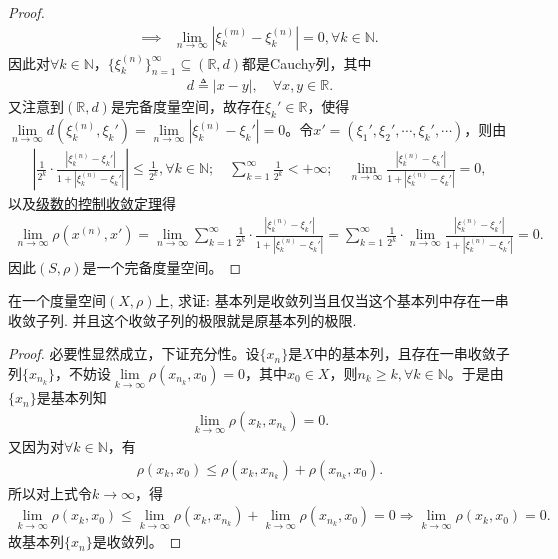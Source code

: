\documentclass[../../main.tex]{subfiles}%
\begin{document}
\begin{proof}
\begin{align*}
\implies&\lim\limits_{n\rightarrow\infty}|\xi_k^{(m)}-\xi_k^{(n)}|=0,\forall k\in\mathbb{N}.
\end{align*}
因此对$\forall k\in\mathbb{N}$，$\{\xi_k^{(n)}\}_{n=1}^{\infty}\subseteq(\mathbb{R},d)$都是Cauchy列，其中
\begin{align*}
d\triangleq|x-y|,\quad\forall x,y\in\mathbb{R}.
\end{align*}
又注意到$(\mathbb{R},d)$是完备度量空间，故存在$\xi_k'\in\mathbb{R}$，使得$\lim\limits_{n\rightarrow\infty}d(\xi_k^{(n)},\xi_k')=\lim\limits_{n\rightarrow\infty}|\xi_k^{(n)}-\xi_k'|=0$。令$x'=(\xi_1',\xi_2',\cdots,\xi_k',\cdots)$，则由
\begin{align*}
\left|\frac{1}{2^k}\cdot\frac{|\xi_k^{(n)}-\xi_k'|}{1+|\xi_k^{(n)}-\xi_k'|}\right|\leqslant\frac{1}{2^k},\forall k\in\mathbb{N};\quad\sum\limits_{k=1}^{\infty}\frac{1}{2^k}<+\infty;\quad\lim\limits_{n\rightarrow\infty}\frac{|\xi_k^{(n)}-\xi_k'|}{1+|\xi_k^{(n)}-\xi_k'|}=0,
\end{align*}
以及\hyperref[Basis of Analytics-theorem:级数的控制收敛定理]{级数的控制收敛定理}得
\begin{align*}
\lim\limits_{n\rightarrow\infty}\rho(x^{(n)},x')=\lim\limits_{n\rightarrow\infty}\sum\limits_{k=1}^{\infty}\frac{1}{2^k}\cdot\frac{|\xi_k^{(n)}-\xi_k'|}{1+|\xi_k^{(n)}-\xi_k'|}=\sum\limits_{k=1}^{\infty}\frac{1}{2^k}\cdot\lim\limits_{n\rightarrow\infty}\frac{|\xi_k^{(n)}-\xi_k'|}{1+|\xi_k^{(n)}-\xi_k'|}=0.
\end{align*}
因此$(S,\rho)$是一个完备度量空间。
\end{proof}

\begin{proposition}\label{proposition:度量空间中基本列收敛当且仅当其子列收敛}
在一个度量空间$(X,\rho)$上, 求证: 基本列是收敛列当且仅当这个基本列中存在一串收敛子列.
并且这个收敛子列的极限就是原基本列的极限.
\end{proposition}
\begin{proof}
必要性显然成立，下证充分性。设$\{x_n\}$是$X$中的基本列，且存在一串收敛子列$\{x_{n_k}\}$，不妨设$\lim\limits_{k\rightarrow \infty}\rho(x_{n_k},x_0)=0$，其中$x_0\in X$，则$n_k\geqslant k,\forall k\in\mathbb{N}$。于是由$\{x_n\}$是基本列知
\begin{align*}
\lim\limits_{k\rightarrow \infty}\rho(x_k,x_{n_k})=0.
\end{align*}
又因为对$\forall k\in\mathbb{N}$，有
\begin{align*}
\rho(x_k,x_0)\leqslant \rho(x_k,x_{n_k})+\rho(x_{n_k},x_0).
\end{align*}
所以对上式令$k\rightarrow \infty$，得
\begin{align*}
\lim\limits_{k\rightarrow \infty}\rho(x_k,x_0)\leqslant \lim\limits_{k\rightarrow \infty}\rho(x_k,x_{n_k})+\lim\limits_{k\rightarrow \infty}\rho(x_{n_k},x_0)=0\Longrightarrow \lim\limits_{k\rightarrow \infty}\rho(x_k,x_0)=0.
\end{align*}
故基本列$\{x_n\}$是收敛列。
\end{proof}
\end{document}
